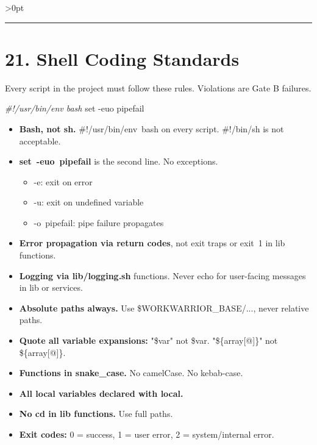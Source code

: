 \documentclass[11pt, a4paper, DIV=14]{scrartcl}
\renewcommand{\texttt}[1]{{\ttfamily\fontsize{8.5}{10.5}\selectfont\color{BabbNavy}#1}}
\newenvironment{Shaded}{%
  \vspace{4pt}%
  \begin{lrbox}{\ShadedBox}%
  \begin{minipage}{\dimexpr\linewidth-2\fboxsep\relax}%
  \vspace{4pt}%
}{%
  \vspace{4pt}%
  \end{minipage}%
  \end{lrbox}%
  \noindent\colorbox{CodeBg}{\usebox{\ShadedBox}}%
  \par\vspace{4pt}%
}
\newcommand{\AttributeTok}[1]{\textcolor{BabbTeal}{#1}}
\newcommand{\BuiltInTok}[1]{\textcolor{BabbTeal}{#1}}
\newcommand{\CommentTok}[1]{\textcolor{BabbGray}{\textit{#1}}}
\newcommand{\NormalTok}[1]{#1}
\newenvironment{Highlighting}{\ttfamily\fontsize{8.2}{11}\selectfont}{}
\providecommand{\tightlist}{\setlength{\itemsep}{2pt}\setlength{\parskip}{0pt}}
\let\origRule\rule
\renewcommand{\rule}[3][0pt]{%
  \ifnum\dimexpr#3\relax>0pt
    \par\vspace{2pt}\noindent{\color{BabbBorder}\origRule[#1]{#2}{#3}}\par\vspace{2pt}%
  \else
    \origRule[#1]{#2}{#3}%
  \fi
}
\begin{document}
\begin{center}\rule{0.5\linewidth}{0.5pt}\end{center}

\section{21. Shell Coding Standards}\label{shell-coding-standards}

Every script in the project must follow these rules. Violations are Gate
B failures.

\begin{Shaded}
\begin{Highlighting}[]
\CommentTok{\#!/usr/bin/env bash}
\BuiltInTok{set} \AttributeTok{{-}euo}\NormalTok{ pipefail}
\end{Highlighting}
\end{Shaded}

\begin{itemize}
\tightlist
\item
  \textbf{Bash, not sh.} \texttt{\#!/usr/bin/env\ bash} on every script.
  \texttt{\#!/bin/sh} is not acceptable.
\item
  \textbf{\texttt{set\ -euo\ pipefail}} is the second line. No
  exceptions.

  \begin{itemize}
  \tightlist
  \item
    \texttt{-e}: exit on error
  \item
    \texttt{-u}: exit on undefined variable
  \item
    \texttt{-o\ pipefail}: pipe failure propagates
  \end{itemize}
\item
  \textbf{Error propagation via return codes}, not exit traps or
  \texttt{exit\ 1} in lib functions.
\item
  \textbf{Logging via \texttt{lib/logging.sh}} functions. Never
  \texttt{echo} for user-facing messages in lib or services.
\item
  \textbf{Absolute paths always.} Use \texttt{\$WORKWARRIOR\_BASE/...},
  never relative paths.
\item
  \textbf{Quote all variable expansions:} \texttt{"\$var"} not
  \texttt{\$var}. \texttt{"\$\{array{[}@{]}\}"} not
  \texttt{\$\{array{[}@{]}\}}.
\item
  \textbf{Functions in snake\_case.} No camelCase. No kebab-case.
\item
  \textbf{All local variables declared with \texttt{local}.}
\item
  \textbf{No \texttt{cd} in lib functions.} Use full paths.
\item
  \textbf{Exit codes:} 0 = success, 1 = user error, 2 = system/internal
  error.
\end{itemize}
\end{document}
